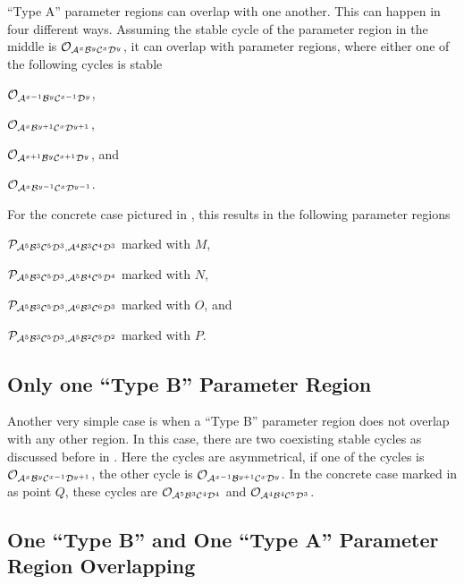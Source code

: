 ``Type A'' parameter regions can overlap with one another.
This can happen in four different ways.
Assuming the stable cycle of the parameter region in the middle is $\mathcal{O}_{\mathcal{A}^x\mathcal{B}^y\mathcal{C}^x\mathcal{D}^y}$, it can overlap with parameter regions, where either one of the following cycles is stable
\begin{enumerate*}
    \item $\mathcal{O}_{\mathcal{A}^{x-1}\mathcal{B}^y\mathcal{C}^{x-1}\mathcal{D}^y}$,
    \item $\mathcal{O}_{\mathcal{A}^x\mathcal{B}^{y+1}\mathcal{C}^x\mathcal{D}^{y+1}}$,
    \item $\mathcal{O}_{\mathcal{A}^{x+1}\mathcal{B}^y\mathcal{C}^{x+1}\mathcal{D}^y}$, and
    \item $\mathcal{O}_{\mathcal{A}^x\mathcal{B}^{y-1}\mathcal{C}^x\mathcal{D}^{y-1}}$.
\end{enumerate*}
For the concrete case pictured in , this results in the following parameter regions
\begin{enumerate*}
    \item $\mathcal{P}_{\mathcal{A}^5\mathcal{B}^3\mathcal{C}^5\mathcal{D}^3, \mathcal{A}^4\mathcal{B}^3\mathcal{C}^4\mathcal{D}^3}$ marked with $M$,
    \item $\mathcal{P}_{\mathcal{A}^5\mathcal{B}^3\mathcal{C}^5\mathcal{D}^3, \mathcal{A}^5\mathcal{B}^4\mathcal{C}^5\mathcal{D}^4}$ marked with $N$,
    \item $\mathcal{P}_{\mathcal{A}^5\mathcal{B}^3\mathcal{C}^5\mathcal{D}^3, \mathcal{A}^6\mathcal{B}^3\mathcal{C}^6\mathcal{D}^3}$ marked with $O$, and
    \item $\mathcal{P}_{\mathcal{A}^5\mathcal{B}^3\mathcal{C}^5\mathcal{D}^3, \mathcal{A}^5\mathcal{B}^2\mathcal{C}^5\mathcal{D}^2}$ marked with $P$.
\end{enumerate*}

\subsection{Only one ``Type B'' Parameter Region}

Another very simple case is when a ``Type B'' parameter region does not overlap with any other region.
In this case, there are two coexisting stable cycles as discussed before in .
Here the cycles are asymmetrical, if one of the cycles is $\mathcal{O}_{\mathcal{A}^x\mathcal{B}^y\mathcal{C}^{x-1}\mathcal{D}^{y+1}}$, the other cycle is $\mathcal{O}_{\mathcal{A}^{x-1}\mathcal{B}^{y+1}\mathcal{C}^x\mathcal{D}^y}$.
In the concrete case marked in  as point $Q$, these cycles are $\mathcal{O}_{\mathcal{A}^5\mathcal{B}^3\mathcal{C}^4\mathcal{D}^4}$ and $\mathcal{O}_{\mathcal{A}^4\mathcal{B}^4\mathcal{C}^5\mathcal{D}^3}$.

\subsection{One ``Type B'' and One ``Type A'' Parameter Region Overlapping}

